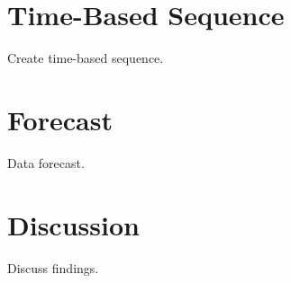 \documentclass[openany]{book}
\begin{document}
\hypertarget{c-model}{%
\section*{Time-Based Sequence}\label{c-model}}

Create time-based sequence.

\hypertarget{c-forecast}{%
\section*{Forecast}\label{c-forecast}}

Data forecast.

\hypertarget{c-discussion}{%
\section*{Discussion}\label{c-discussion}}

Discuss findings.


\end{document}
